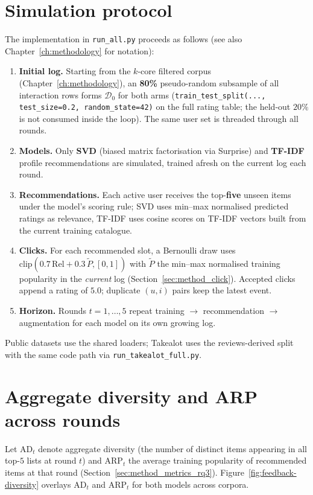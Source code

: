 \section{Simulation protocol}
The implementation in \texttt{run\_all.py} proceeds as follows (see also Chapter~\ref{ch:methodology} for notation):
\begin{enumerate}
  \item \textbf{Initial log.} Starting from the $k$-core filtered corpus (Chapter~\ref{ch:methodology}), an \textbf{80\%} pseudo-random subsample of all interaction rows forms $\mathcal{D}_0$ for both arms (\texttt{train\_test\_split(..., test\_size=0.2, random\_state=42)} on the full rating table; the held-out $20\%$ is not consumed inside the loop). The same user set is threaded through all rounds.
  \item \textbf{Models.} Only \textbf{SVD} (biased matrix factorisation via Surprise) and \textbf{TF-IDF} profile recommendations are simulated, trained afresh on the current log each round.
  \item \textbf{Recommendations.} Each active user receives the top-\textbf{five} unseen items under the model's scoring rule; SVD uses min--max normalised predicted ratings as relevance, TF-IDF uses cosine scores on TF-IDF vectors built from the current training catalogue.
  \item \textbf{Clicks.} For each recommended slot, a Bernoulli draw uses $\mathrm{clip}(0.7\,\mathrm{Rel}+0.3\,\tilde{P},[0,1])$ with $\tilde{P}$ the min--max normalised training popularity in the \emph{current} log (Section~\ref{sec:method_click}). Accepted clicks append a rating of $5.0$; duplicate $(u,i)$ pairs keep the latest event.
  \item \textbf{Horizon.} Rounds $t=1,\ldots,5$ repeat training $\rightarrow$ recommendation $\rightarrow$ augmentation for each model on its own growing log.
\end{enumerate}
Public datasets use the shared loaders; Takealot uses the reviews-derived split with the same code path via \texttt{run\_takealot\_full.py}.

\section{Aggregate diversity and ARP across rounds}
Let $\mathrm{AD}_t$ denote aggregate diversity (the number of distinct items appearing in all top-$5$ lists at round $t$) and $\mathrm{ARP}_t$ the average training popularity of recommended items at that round (Section~\ref{sec:method_metrics_rq3}). Figure~\ref{fig:feedback-diversity} overlays $\mathrm{AD}_t$ and $\mathrm{ARP}_t$ for both models across corpora.

